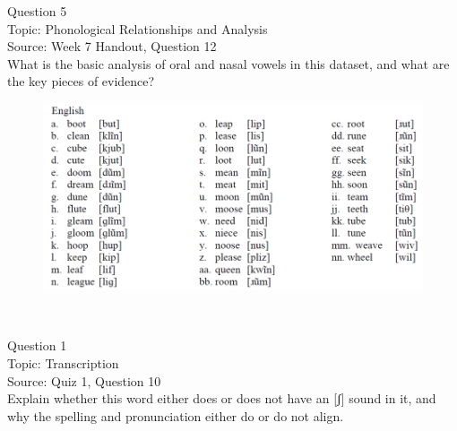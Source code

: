 \documentclass[12pt]{article}
\begin{document}
\newpage

{\large Question 5}\\

Topic: Phonological Relationships and Analysis\\
Source: Week 7 Handout, Question 12\\

What is the basic analysis of oral and nasal vowels in this dataset, and what are the key pieces of evidence?\\

\begin{figure}[H]
\includegraphics{../images/english12.png}
\end{figure}

\newpage

\begin{center}
\textbf{{\color{red}{\HUGE END OF EXAM}}}\\

\end{center}
\newpage

\begin{center}
\textbf{{\color{blue}{\HUGE START OF EXAM\\}}}

\textbf{{\color{blue}{\HUGE Student ID: 68935\\}}}

\textbf{{\color{blue}{\HUGE \\}}}

\end{center}
\newpage

{\large Question 1}\\

Topic: Transcription\\
Source: Quiz 1, Question 10\\

Explain whether this word either does or does not have an [ʃ] sound in it, and why the spelling and pronunciation either do or do not align.\\
\end{document}
